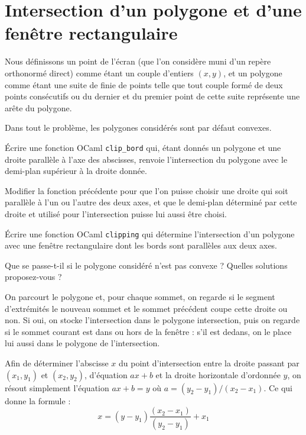 \renewcommand{\SourceFile}{6-geometrie-et-images/src/6-5.ml}

\section[Intersection d'un polygone et d'une fenêtre rectangulaire]{Intersection d'un polygone et d'une\\ fenêtre rectangulaire}

Nous définissons un point de l'écran (que l'on considère muni d'un repère orthonormé direct) comme étant un couple d'entiers $(x,y)$, et un polygone comme étant une suite de finie de points telle que tout couple formé de deux points consécutifs ou du dernier et du premier point de cette suite représente une arête du polygone.
\medskip

Dans tout le problème, les polygones considérés sont par défaut convexes.

\Q
Écrire une fonction OCaml \texttt{clip\_bord} qui, étant donnés un polygone et une droite parallèle à l'axe des abscisses, renvoie l'intersection du polygone avec le demi-plan supérieur à la droite donnée.

\Q
Modifier la fonction précédente pour que l'on puisse choisir une droite qui soit parallèle à l'un ou l'autre des deux axes, et que le demi-plan déterminé par cette droite et utilisé pour l'intersection puisse lui aussi être choisi.

\Q
Écrire une fonction OCaml \texttt{clipping} qui détermine l'intersection d'un polygone avec une fenêtre rectangulaire dont les bords sont parallèles aux deux axes.

\Q
Que se passe-t-il si le polygone considéré n'est pas convexe ? Quelles solutions proposez-vous ?

\Corrige

\Q
On parcourt le polygone et, pour chaque sommet, on regarde si le segment d'extrémités le nouveau sommet et le sommet précédent coupe cette droite ou non. Si oui, on stocke l'intersection dans le polygone intersection, puis on regarde si le sommet courant est dans ou hors de la fenêtre : s'il est dedans, on le place lui aussi dans le polygone de l'intersection.
\medskip

Afin de déterminer l'abscisse $x$ du point d'intersection entre la droite passant par $(x_1,y_1)$ et $(x_2,y_2)$, d'équation $ax+b$ et la droite horizontale d'ordonnée $y$, on résout simplement l'équation $ax+b=y$ où $a=(y_2-y_1)/(x_2-x_1)$. Ce qui donne la formule :
\[
    x = (y-y_1)\frac{(x_2-x_1)}{(y_2-y_1)} + x_1
\]

